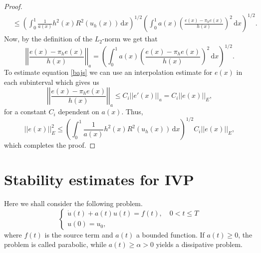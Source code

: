 \documentclass[12pt, a4paper]{article}
\newcommand{\rd}{\ensuremath{\mathrm{d}}}
\newcommand{\id}{\ensuremath{\,\rd}}
\numberwithin{equation}{section}
\begin{document}
\begin{proof}
\begin{equation*}
\begin{split}
&\leq \left( \int_0^1 \frac{1}{a(x)}h^2(x)R^2(u_h(x))\id x \right)^{1/2}\left(\int_0^1 a(x)\left(\frac{e(x)-\pi_he(x)}{h(x)}\right)^2\id x\right)^{1/2}.
\end{split}
\end{equation*}
Now, by the definition of the $L_2$-norm we get that
\begin{equation}
\label{bajs}
\left |\left| \frac{e(x)-\pi_he(x)}{h(x)} \right | \right |_a = \left( \int_0^1 a(x) \left ( \frac{e(x)-\pi_he(x)}{h(x)} \right ) ^2\id x \right ) ^{1/2}.
\end{equation}
To estimate equation \eqref{bajs} we can use an interpolation estimate for $e(x)$ in each subinterval which gives us
\begin{equation*}
\left | \left | \frac{e(x)-\pi_he(x)}{h(x)} \right | \right |_a \leq C_i||e'(x)||_a = C_i||e(x)||_E,
\end{equation*}
for a constant $C_i$ dependent on $a(x)$. Thus,
\begin{equation*}
||e(x)||^2_E \leq \left( \int_0^1 \frac{1}{a(x)}h^2(x)R^2(u_h(x))\id x\right)^{1/2} C_i||e(x)||_E,
\end{equation*}
which completes the proof.
\end{proof}
\section{Stability estimates for IVP}
Here we shall consider the following problem.
\begin{equation}
\label{DEIVP}
\left\{ \begin{array}{l}
\dot{u}(t)+a(t)u(t) = f(t), \quad 0<t\leq T\\
u(0) = u_0,
\end{array}\right.
\end{equation}
where $f(t)$ is the source term and $a(t)$ a bounded function. If $a(t)\geq0$, the problem is called parabolic, while $a(t)\geq\alpha>0$ yields a dissipative problem.
\end{document}

